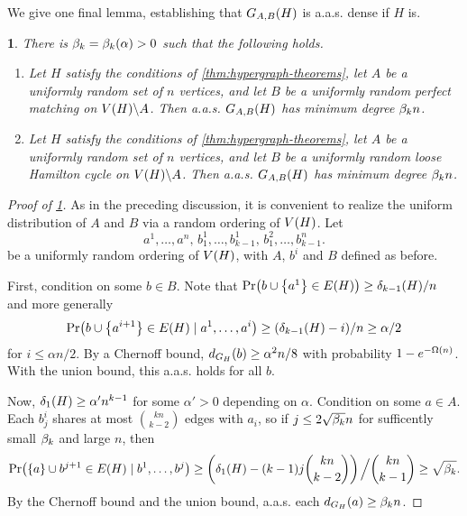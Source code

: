 \documentclass[11pt,english]{article}
\theoremstyle{plain}
\theoremstyle{definition}
\theoremstyle{definition}
\theoremstyle{plain}
\theoremstyle{plain}
\theoremstyle{plain}
\newtheorem{lem}[thm]{\protect\lemmaname}
\theoremstyle{plain}
\theoremstyle{remark}
\theoremstyle{remark}
\let\originalleft\left
\let\originalright\right
\renewcommand{\left}{\mathopen{}\mathclose\bgroup\originalleft}
\renewcommand{\right}{\aftergroup\egroup\originalright}
\providecommand{\lemmaname}{Lemma}
\begin{document}
We give one final lemma, establishing that $G_{A,B}\left(H\right)$ is a.a.s. dense if $H$ is.
\begin{lem}
\label{lem:hypergraph-bipartite-degree-transfer}There is $\a=\a\left(\alpha\right)>0$ such that the following
holds.

\begin{enumerate}[topsep=0px,label=(\alph*)]

\item{\label{itm:hypergraph-bipartite-matching-degree-transfer}Let $H$ satisfy the conditions of \ref{thm:hypergraph-theorems},
let $A$ be a uniformly random set of $n$ vertices, and let $B$
be a uniformly random perfect matching on $V\left(H\right)\backslash A$.
Then a.a.s. $G_{A,B}\left(H\right)$ has minimum degree $\beta_k n$.}

\item{\label{itm:hypergraph-bipartite-cycle-degree-transfer}Let $H$ satisfy the conditions of \ref{thm:hypergraph-theorems},
let $A$ be a uniformly random set of $n$ vertices, and let $B$
be a uniformly random loose Hamilton cycle on $V\left(H\right)\backslash A$.
Then a.a.s. $G_{A,B}\left(H\right)$ has minimum degree $\beta_k n$.}

\end{enumerate}\end{lem}
\begin{proof}
[Proof of \ref{lem:hypergraph-bipartite-degree-transfer}]As in the preceding discussion, it is convenient to realize the uniform
distribution of $A$ and $B$ via a random ordering of $V\left(H\right)$.
Let 
\[
a^{1},\dots,a^{n},\, b_{1}^{1},\dots,b_{k-1}^{1},\, b_{1}^{2},\dots,b_{k-1}^{n}.
\]
be a uniformly random ordering of $V\left(H\right)$, with $A$, $b^i$ and
$B$ defined as before.

First, condition on some $b\in B$. Note that $\Pr\left(b\cup\left\{ a^{1}\right\} \in E\left(H\right)\right)\ge\delta_{k-1}\left(H\right)/n$
and more generally 
\[
\Pr\left(b\cup\left\{ a^{i+1}\right\} \in E\left(H\right)\mid a^{1},\dots,a^{i}\right)\ge\left(\delta_{k-1}\left(H\right)-i\right)/n\ge\alpha/2
\]
for $i\le\alpha n/2$. By a Chernoff bound, $d_{G_{H}}\left(b\right)\ge\alpha^{2}n/8$
with probability $1-e^{-\Omega\left(n\right)}$. With the union bound,
this a.a.s. holds for all $b$.

Now, $\delta_{1}\left(H\right)\ge\alpha'n^{k-1}$ for some $\alpha'>0$
depending on $\alpha$. Condition on some $a\in A$. Each $b_{j}^{i}$
shares at most ${kn \choose k-2}$ edges with $a_{i}$, so if $j\le2\sqrt{\beta_k}n$
for sufficently small $\beta_k$ and large $n$,
then
\[
\Pr\left(\left\{ a\right\} \cup b^{j+1}\in E\left(H\right)\mid b^{1},\dots,b^{j}\right)\ge\left(\delta_{1}\left(H\right)-\left(k-1\right)j{kn \choose k-2}\right)\left.\vphantom{\sum}\right/{kn \choose k-1}\ge\sqrt{\amat}.
\]
By the Chernoff bound and the union bound, a.a.s. each $d_{G_{H}}\left(a\right)\ge\amat n$.
\end{proof}
\end{document}
